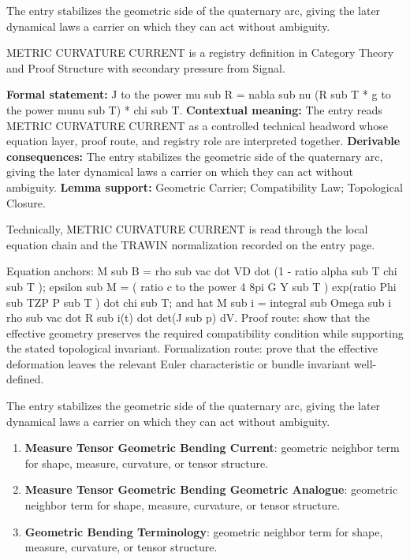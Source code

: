The entry stabilizes the geometric side of the quaternary arc, giving the later dynamical laws a carrier on which they can act without ambiguity.
\clearpage


\begingroup\small
{}
METRIC CURVATURE CURRENT is a registry definition in Category Theory and Proof Structure with secondary pressure from Signal.

\begingroup\footnotesize\setlength{\emergencystretch}{3em}\sloppy
\textbf{Formal statement:} J to the power mu sub R = nabla sub nu (R sub T * g to the power munu sub T) * chi sub T. \textbf{Contextual meaning:} The entry reads METRIC CURVATURE CURRENT as a controlled technical headword whose equation layer, proof route, and registry role are interpreted together. \textbf{Derivable consequences:} The entry stabilizes the geometric side of the quaternary arc, giving the later dynamical laws a carrier on which they can act without ambiguity. \textbf{Lemma support:} Geometric Carrier; Compatibility Law; Topological Closure.\par
\endgroup

Technically, METRIC CURVATURE CURRENT is read through the local equation chain and the TRAWIN normalization recorded on the entry page.

Equation anchors: M sub B = rho sub vac dot VD dot (1 - ratio alpha sub T chi sub T ); epsilon sub M = ( ratio c to the power 4 8pi G Y sub T ) exp(ratio Phi sub TZP P sub T ) dot chi sub T; and hat M sub i = integral sub Omega sub i rho sub vac dot R sub i(t) dot det(J sub p) dV. Proof route: show that the effective geometry preserves the required compatibility condition while supporting the stated topological invariant. Formalization route: prove that the effective deformation leaves the relevant Euler characteristic or bundle invariant well-defined.

The entry stabilizes the geometric side of the quaternary arc, giving the later dynamical laws a carrier on which they can act without ambiguity.
\endgroup

\begin{enumerate}[leftmargin=1.6em,itemsep=6pt,topsep=4pt]
\item \textbf{Measure Tensor Geometric Bending Current}: geometric neighbor term for shape, measure, curvature, or tensor structure.
\item \textbf{Measure Tensor Geometric Bending Geometric Analogue}: geometric neighbor term for shape, measure, curvature, or tensor structure.
\item \textbf{Geometric Bending Terminology}: geometric neighbor term for shape, measure, curvature, or tensor structure.
\end{enumerate}

